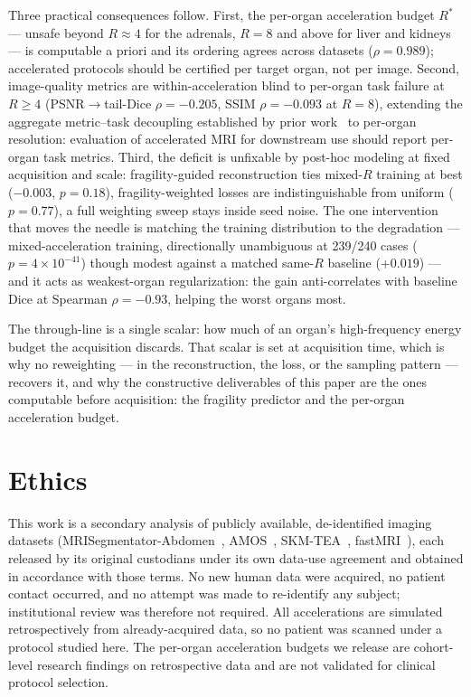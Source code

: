 \documentclass[10pt,twocolumn,letterpaper]{article}
\begin{document}
Three practical consequences follow. First, the per-organ acceleration budget $R^{*}$ --- unsafe beyond $R\approx4$ for the adrenals, $R=8$ and above for liver and kidneys --- is computable a priori and its ordering agrees across datasets ($\rho=0.989$); accelerated protocols should be certified per target organ, not per image. Second, image-quality metrics are within-acceleration blind to per-organ task failure at $R\geq4$ (PSNR$\rightarrow$tail-Dice $\rho=-0.205$, SSIM $\rho=-0.093$ at $R{=}8$), extending the aggregate metric--task decoupling established by prior work~\cite{morshuis2025,tolpadi2023,muckley2021} to per-organ resolution: evaluation of accelerated MRI for downstream use should report per-organ task metrics. Third, the deficit is unfixable by post-hoc modeling at fixed acquisition and scale: fragility-guided reconstruction ties mixed-$R$ training at best ($-0.003$, $p=0.18$), fragility-weighted losses are indistinguishable from uniform ($p=0.77$), a full weighting sweep stays inside seed noise. The one intervention that moves the needle is matching the training distribution to the degradation --- mixed-acceleration training, directionally unambiguous at 239/240 cases ($p=4\times10^{-41}$) though modest against a matched same-$R$ baseline ($+0.019$) --- and it acts as weakest-organ regularization: the gain anti-correlates with baseline Dice at Spearman $\rho{=}-0.93$, helping the worst organs most.

The through-line is a single scalar: how much of an organ's high-frequency energy budget the acquisition discards. That scalar is set at acquisition time, which is why no reweighting --- in the reconstruction, the loss, or the sampling pattern --- recovers it, and why the constructive deliverables of this paper are the ones computable before acquisition: the fragility predictor and the per-organ acceleration budget.

\section*{Ethics}
This work is a secondary analysis of publicly available, de-identified imaging datasets
(MRISegmentator-Abdomen~\cite{mrisegmentator2024}, AMOS~\cite{amos2022},
SKM-TEA~\cite{desai2022skmtea}, fastMRI~\cite{zbontar2018fastmri}), each released by its original
custodians under its own data-use agreement and obtained in accordance with those terms. No new human
data were acquired, no patient contact occurred, and no attempt was made to re-identify any subject;
institutional review was therefore not required. All accelerations are simulated retrospectively from
already-acquired data, so no patient was scanned under a protocol studied here. The per-organ
acceleration budgets we release are cohort-level research findings on retrospective data and are not
validated for clinical protocol selection.
\end{document}
